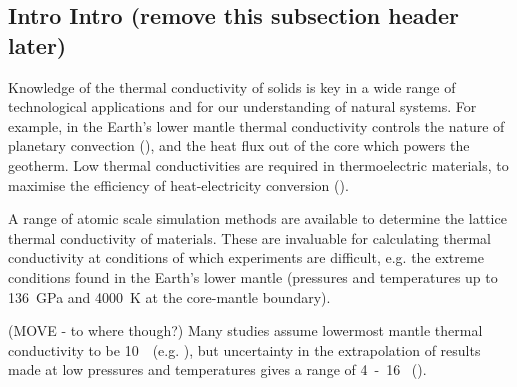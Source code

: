 \documentclass[%
preprint,                                  %
nofootinbib,
 amsmath,amssymb,
 aps,
]{revtex4-1}
\begin{document}
\subsection{\label{sec:intro.intro}Intro Intro (remove this subsection header later)}


Knowledge of the thermal conductivity of solids is key in a wide range of technological applications and for our understanding of natural systems. For example, in the Earth's lower mantle thermal conductivity controls the nature of planetary convection (\citet{Tosi2013}), and the heat flux out of the core which powers the geotherm. Low thermal conductivities are required in thermoelectric materials, to maximise the efficiency of heat-electricity conversion (\citet{Snyder2008}).

A range of atomic scale simulation methods are available to determine the lattice thermal conductivity of materials. These are invaluable for calculating thermal conductivity at conditions of which experiments are difficult, e.g. the extreme conditions found in the Earth's lower mantle (pressures and temperatures up to 136~GPa and 4000~K at the core-mantle boundary). 


(MOVE - to where though?) Many studies assume lowermost mantle thermal conductivity to be 10~\wmk~(e.g. \citet{Lay2008}), but uncertainty in the extrapolation of results made at low pressures and temperatures gives a range of 4~-~16 \wmk~(\citet{Brown1986, Osako1991, Hofmeister1999, Goncharov2009, Manthilake2011, Ohta2012}).

 


\end{document}
